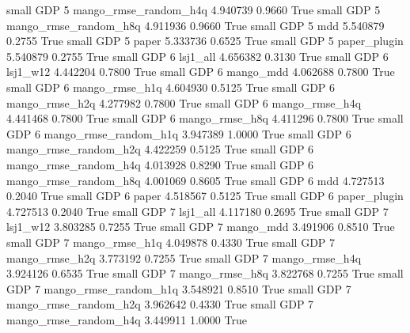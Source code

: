      small      GDP                 5 mango_rmse_random_h4q   4.940739      0.9660    True
     small      GDP                 5 mango_rmse_random_h8q   4.911936      0.9660    True
     small      GDP                 5                   mdd   5.540879      0.2755    True
     small      GDP                 5                 paper   5.333736      0.6525    True
     small      GDP                 5          paper_plugin   5.540879      0.2755    True
     small      GDP                 6              lsj1_all   4.656382      0.3130    True
     small      GDP                 6              lsj1_w12   4.442204      0.7800    True
     small      GDP                 6             mango_mdd   4.062688      0.7800    True
     small      GDP                 6        mango_rmse_h1q   4.604930      0.5125    True
     small      GDP                 6        mango_rmse_h2q   4.277982      0.7800    True
     small      GDP                 6        mango_rmse_h4q   4.441468      0.7800    True
     small      GDP                 6        mango_rmse_h8q   4.411296      0.7800    True
     small      GDP                 6 mango_rmse_random_h1q   3.947389      1.0000    True
     small      GDP                 6 mango_rmse_random_h2q   4.422259      0.5125    True
     small      GDP                 6 mango_rmse_random_h4q   4.013928      0.8290    True
     small      GDP                 6 mango_rmse_random_h8q   4.001069      0.8605    True
     small      GDP                 6                   mdd   4.727513      0.2040    True
     small      GDP                 6                 paper   4.518567      0.5125    True
     small      GDP                 6          paper_plugin   4.727513      0.2040    True
     small      GDP                 7              lsj1_all   4.117180      0.2695    True
     small      GDP                 7              lsj1_w12   3.803285      0.7255    True
     small      GDP                 7             mango_mdd   3.491906      0.8510    True
     small      GDP                 7        mango_rmse_h1q   4.049878      0.4330    True
     small      GDP                 7        mango_rmse_h2q   3.773192      0.7255    True
     small      GDP                 7        mango_rmse_h4q   3.924126      0.6535    True
     small      GDP                 7        mango_rmse_h8q   3.822768      0.7255    True
     small      GDP                 7 mango_rmse_random_h1q   3.548921      0.8510    True
     small      GDP                 7 mango_rmse_random_h2q   3.962642      0.4330    True
     small      GDP                 7 mango_rmse_random_h4q   3.449911      1.0000    True
